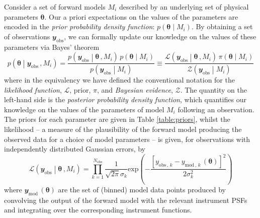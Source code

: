 \documentclass[fleqn,usenatbib]{mnras}
\begin{document}
Consider a set of forward models $M_{i}$ described by an underlying set of physical parameters $\boldsymbol{\theta}$. Our a priori expectations on the values of the parameters are encoded in the \emph{prior probability density function}: $p \left(\boldsymbol{\theta} \middle| M_{i} \right)$. By obtaining a set of observations $\mathbfit{y}_{\mathrm{obs}}$, we can formally update our knowledge on the values of these parameters via Bayes' theorem
%
\begin{equation}
p \left(\boldsymbol{\theta} \middle| \mathbfit{y}_{\mathrm{obs}} \, , M_{i} \right) = \frac{p \left(\mathbfit{y}_{\mathrm{obs}} \middle| \boldsymbol{\theta} \, , M_{i} \right) \, p \left(\boldsymbol{\theta} \middle| M_{i} \right)}{p \left(\mathbfit{y}_{\mathrm{obs}} \middle| M_{i} \right)} \equiv \frac{\mathcal{L}\left(\mathbfit{y}_{\mathrm{obs}} \middle| \boldsymbol{\theta} \, , M_{i} \right) \, \pi\left(\boldsymbol{\theta} \middle| M_{i} \right)}{\mathcal{Z}\left(\mathbfit{y}_{\mathrm{obs}} \middle| M_{i} \right)}
	\label{eq:bayes_theorem}
\end{equation}
%
where in the equivalency we have defined the conventional notation for the \emph{likelihood function}, $\mathcal{L}$, prior, $\pi$, and \emph{Bayesian evidence}, $\mathcal{Z}$. The quantity on the left-hand side is the \emph{posterior probability density function}, which quantifies our knowledge on the values of the parameters of model $M_{i}$ following an observation. The priors for each parameter are given in Table \ref{table:priors}, whilst the likelihood -- a measure of the plausibility of the forward model producing the observed data for a choice of model parameters -- is given, for observations with independently distributed Gaussian errors, by
%
\begin{equation}
\mathcal{L}\left(\mathbfit{y}_{\mathrm{obs}} \middle| \boldsymbol{\theta} \, , M_{i} \right) = \prod_{k=1}^{N_{\mathrm{obs}}} \frac{1}{\sqrt{2\pi}\sigma_{k}} \mathrm{exp}\left(-\frac{[y_{\mathrm{obs} \,, \,k} - y_{\mathrm{mod} \,, \,k} \,(\boldsymbol{\theta})]^2}{2\sigma_{k}^2}\right)
	\label{eq:likelihood}
\end{equation}
%
where $\mathbfit{y}_{\mathrm{mod}} \,(\boldsymbol{\theta})$ are the set of (binned) model data points produced by convolving the output of the forward model with the relevant instrument PSFs and integrating over the corresponding instrument functions.
\end{document}
